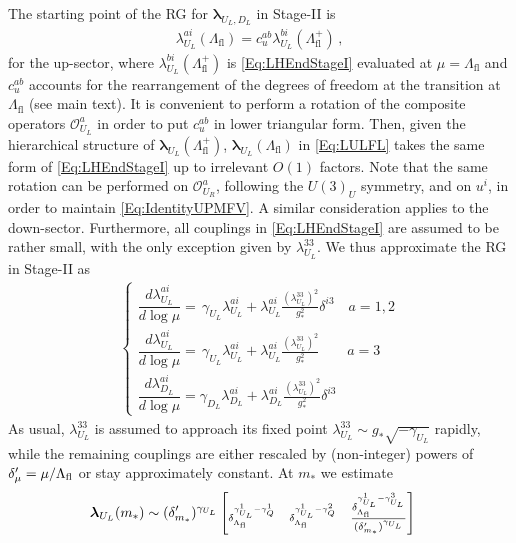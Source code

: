 \documentclass[aps,prl,twocolumn,showpacs,10pt,preprintnumbers,nofootinbib]{revtex4-2}
\newcommand{\gst}{g_*}
\newcommand{\mst}{m_*}
\newcommand{\Lfl}{\Lambda_{\text{fl}}}
\newcommand{\op}{\mathcal{O}}
\begin{document}
{The starting point of the RG for $\boldsymbol{\lambda}_{U_L,D_L}$ in Stage-II is
\begin{align}\label{Eq:LULFL}
    \lambda_{U_L}^{ai} (\Lfl) = c^{ab}_u \lambda_{U_L}^{bi}(\Lfl^+)\,,
\end{align}
for the up-sector, where $\lambda_{U_L}^{bi}(\Lfl^+)$ is \eqref{Eq:LHEndStageI} evaluated at $\mu=\Lfl$ and $c^{ab}_{u}$ accounts for the rearrangement of the degrees of freedom at the transition at $\Lfl$ (see main text). It is convenient to perform a rotation of the composite operators $\op_{U_L}^a$ in order to put $c_{u}^{ab}$ in lower triangular form. Then, given the hierarchical structure of $\boldsymbol{\lambda}_{U_L}(\Lfl^+)$, $\boldsymbol{\lambda}_{U_L}(\Lfl)$ in \eqref{Eq:LULFL} takes the same form of \eqref{Eq:LHEndStageI} up to irrelevant $O(1)$ factors. Note that the same rotation can be performed on $\op_{U_R}^a$, following the $U(3)_U$ symmetry, and on $u^i$, in order to maintain \eqref{Eq:IdentityUPMFV}. A similar consideration applies to the down-sector. Furthermore, all couplings in \eqref{Eq:LHEndStageI} are assumed to be rather small, with the only exception given by $\lambda_{U_L}^{33}$. We thus approximate the RG in Stage-II as 
\begin{align}
\begin{cases}
    \dfrac{d \lambda_{U_L}^{ai}}{ d \log \mu} = \, \gamma_{U_L}\lambda_{U_L}^{ai} + \lambda_{U_L}^{ai}\frac{(\lambda_{U_L}^{33})^2}{\gst^2} \delta^{i3}\quad a=1,2\\
    \dfrac{d \lambda_{U_L}^{ai}}{ d \log \mu} = \, \gamma_{U_L}\lambda_{U_L}^{ai} + \lambda_{U_L}^{ai}\frac{(\lambda_{U_L}^{33})^2}{\gst^2}\quad\quad a=3\\
    \dfrac{d \lambda_{D_L}^{ai}}{ d \log \mu} =  \gamma_{D_L}\lambda_{D_L}^{ai} + \lambda_{D_L}^{ai}\frac{(\lambda_{U_L}^{33})^2}{\gst^2} \delta^{i3}
\end{cases}
\end{align}
As usual, $\lambda_{U_L}^{33}$ is assumed to approach its fixed point $\lambda_{U_L}^{33}\sim \gst\sqrt{-\gamma_{U_L}}$ rapidly, while the remaining couplings are either rescaled by (non‐integer) powers of $\delta'_{\mu}=\mu/\Lambda_{\rm fl}$ or stay approximately constant. At $\mst$ we estimate
\begin{align}\label{Eq:LstageIIUp}
\boldsymbol{\lambda}_{U_L}(\mst) &\sim (\delta'_{\mst})^{\gamma_{U_L}}
\scriptsize
\begin{bmatrix}
\delta_{\Lfl}^{\gamma_{U_L}^1-\gamma_Q^1} & \delta_{\Lfl}^{\gamma_{U_L}^1-\gamma_Q^2} & \dfrac{\delta_{\Lfl}^{\gamma_{U_L}^1-\gamma_{U_L}^3}}{(\delta'_{\mst})^{\gamma_{U_L}}} \\

\end{bmatrix}
\end{align}}
\end{document}
